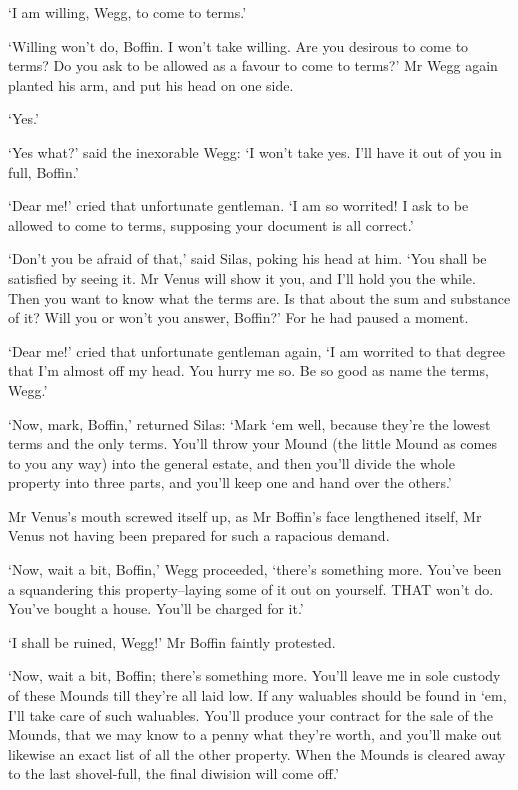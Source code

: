 ‘I am willing, Wegg, to come to terms.’

‘Willing won’t do, Boffin. I won’t take willing. Are you desirous to
come to terms? Do you ask to be allowed as a favour to come to terms?’
Mr Wegg again planted his arm, and put his head on one side.

‘Yes.’

‘Yes what?’ said the inexorable Wegg: ‘I won’t take yes. I’ll have it
out of you in full, Boffin.’

‘Dear me!’ cried that unfortunate gentleman. ‘I am so worrited! I ask to
be allowed to come to terms, supposing your document is all correct.’

‘Don’t you be afraid of that,’ said Silas, poking his head at him. ‘You
shall be satisfied by seeing it. Mr Venus will show it you, and I’ll
hold you the while. Then you want to know what the terms are. Is
that about the sum and substance of it? Will you or won’t you answer,
Boffin?’ For he had paused a moment.

‘Dear me!’ cried that unfortunate gentleman again, ‘I am worrited to
that degree that I’m almost off my head. You hurry me so. Be so good as
name the terms, Wegg.’

‘Now, mark, Boffin,’ returned Silas: ‘Mark ‘em well, because they’re
the lowest terms and the only terms. You’ll throw your Mound (the little
Mound as comes to you any way) into the general estate, and then you’ll
divide the whole property into three parts, and you’ll keep one and hand
over the others.’

Mr Venus’s mouth screwed itself up, as Mr Boffin’s face lengthened
itself, Mr Venus not having been prepared for such a rapacious demand.

‘Now, wait a bit, Boffin,’ Wegg proceeded, ‘there’s something more.
You’ve been a squandering this property--laying some of it out on
yourself. THAT won’t do. You’ve bought a house. You’ll be charged for
it.’

‘I shall be ruined, Wegg!’ Mr Boffin faintly protested.

‘Now, wait a bit, Boffin; there’s something more. You’ll leave me in
sole custody of these Mounds till they’re all laid low. If any waluables
should be found in ‘em, I’ll take care of such waluables. You’ll produce
your contract for the sale of the Mounds, that we may know to a penny
what they’re worth, and you’ll make out likewise an exact list of
all the other property. When the Mounds is cleared away to the last
shovel-full, the final diwision will come off.’

